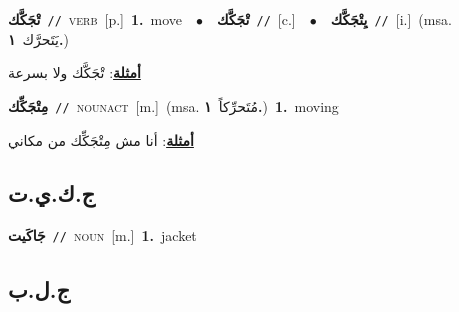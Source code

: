 \documentclass[10pt,a4paper,twoside]{article} %
\begin{document}
\begin{multicols}{2}
{\setlength\topsep{0pt}\textbf{\foreignlanguage{arabic}{تْجَكَّك}}\ {\color{gray}\texttt{//}\color{black}}\ \textsc{verb}\ [p.]\ \textbf{1.}~move\ \ $\bullet$\ \ \setlength\topsep{0pt}\textbf{\foreignlanguage{arabic}{تْجَكَّك}}\ {\color{gray}\texttt{//}\color{black}}\ [c.]\ \ $\bullet$\ \ \setlength\topsep{0pt}\textbf{\foreignlanguage{arabic}{يِتْجَكَّك}}\ {\color{gray}\texttt{//}\color{black}}\ [i.]\ \color{gray}(msa. \foreignlanguage{arabic}{يَتَحرَّك}~\foreignlanguage{arabic}{\textbf{١.}})\color{black}\  \begin{flushright}\color{gray}\foreignlanguage{arabic}{\textbf{\underline{\foreignlanguage{arabic}{أمثلة}}}: تْجَكَّك ولا بسرعة}\end{flushright}\color{black}} \vspace{2mm}

{\setlength\topsep{0pt}\textbf{\foreignlanguage{arabic}{مِتْجَكِّك}}\ {\color{gray}\texttt{//}\color{black}}\ \textsc{noun\textunderscore act}\ [m.]\ \color{gray}(msa. \foreignlanguage{arabic}{مُتَحرِّكاً}~\foreignlanguage{arabic}{\textbf{١.}})\color{black}\ \textbf{1.}~moving\  \begin{flushright}\color{gray}\foreignlanguage{arabic}{\textbf{\underline{\foreignlanguage{arabic}{أمثلة}}}: أنا مش مِتْجَكِّك من مكاني}\end{flushright}\color{black}} \vspace{2mm}

\vspace{-3mm}
\subsection*{\color{blue}\foreignlanguage{arabic}{ج.ك.ي.ت}\color{blue}{ (ntws)}} 

{\setlength\topsep{0pt}\textbf{\foreignlanguage{arabic}{جَاكَيت}}\ {\color{gray}\texttt{//}\color{black}}\ \textsc{noun}\ [m.]\ \textbf{1.}~jacket\ } \vspace{2mm}

\vspace{-3mm}
\subsection*{\color{blue}\foreignlanguage{arabic}{ج.ل.ب}\color{blue}{}} 


\end{multicols}
\end{document}
